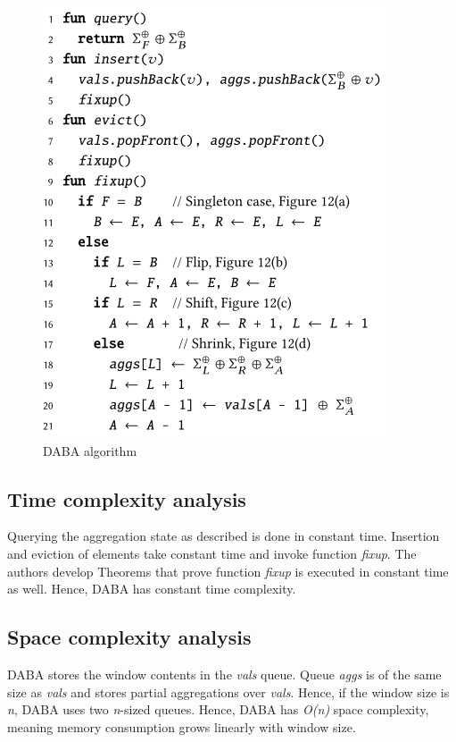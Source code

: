 \begin{figure}[!htb]
    \begin{center}
      \includegraphics[scale=0.7]{figures/daba-pseudocode.png}
      \caption{DABA algorithm}
      \label{fig:pseudo-daba}
    \end{center}
\end{figure}


\subsection*{Time complexity analysis}
Querying the aggregation state as described is done in constant time. Insertion and eviction of elements take constant time and invoke function \textit{fixup}. The authors develop Theorems that prove function \textit{fixup} is executed in constant time as well. Hence, DABA has constant time complexity.

\subsection*{Space complexity analysis}
DABA stores the window contents in the \textit{vals} queue. Queue \textit{aggs} is of the same size as \textit{vals} and stores partial aggregations over \textit{vals}. Hence, if the window size is \textit{n}, DABA uses two \textit{n}-sized queues. Hence, DABA has \textit{O(n)} space complexity, meaning memory consumption grows linearly with window size.

